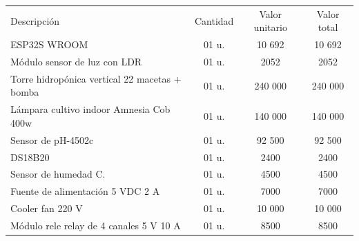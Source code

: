 \documentclass[
11pt, %
]{charter}
\begin{document}
\begin{table}[htpb]
\centering
\begin{tabularx}{\linewidth}{@{}|X|c|r|r|@{}}
\hline
\rowcolor[HTML]{C0C0C0} 
\multicolumn{4}{|c|}{\cellcolor[HTML]{C0C0C0}COSTOS DIRECTOS} \\ \hline
\rowcolor[HTML]{C0C0C0} 
Descripción &
  \multicolumn{1}{c|}{\cellcolor[HTML]{C0C0C0}Cantidad} &
  \multicolumn{1}{c|}{\cellcolor[HTML]{C0C0C0}Valor unitario} &
  \multicolumn{1}{c|}{\cellcolor[HTML]{C0C0C0}Valor total} \\ \hline
ESP32S WROOM &
  \multicolumn{1}{c|}{01 u.} & 
  \multicolumn{1}{c|}{10 692} &
  \multicolumn{1}{c|}{10 692} \\ \hline
  
  Módulo sensor de luz con LDR &
  \multicolumn{1}{c|}{01 u.} & 
  \multicolumn{1}{c|}{2052} &
  \multicolumn{1}{c|}{2052} \\ \hline 
  
   Torre hidropónica vertical 22 macetas + bomba&
  \multicolumn{1}{c|}{01 u.} & 
  \multicolumn{1}{c|}{240 000} &
  \multicolumn{1}{c|}{240 000} \\ \hline
  
     Lámpara cultivo indoor Amnesia Cob 400w &
  \multicolumn{1}{c|}{01 u.} & 
  \multicolumn{1}{c|}{140 000} &
  \multicolumn{1}{c|}{140 000} \\ \hline
  
    Sensor de pH-4502c &
  \multicolumn{1}{c|}{01 u.} & 
  \multicolumn{1}{c|}{92 500} &
  \multicolumn{1}{c|}{92 500} \\ \hline

  DS18B20 &
  \multicolumn{1}{c|}{01 u.} & 
  \multicolumn{1}{c|}{2400} &
  \multicolumn{1}{c|}{2400} \\ \hline  
  
 Sensor de humedad C.&
  \multicolumn{1}{c|}{01 u.} &
  \multicolumn{1}{c|}{4500} &
  \multicolumn{1}{c|}{4500} \\ \hline
  
   Fuente de alimentación 5 VDC 2 A&
  \multicolumn{1}{c|}{01 u.} &
  \multicolumn{1}{c|}{7000} &
  \multicolumn{1}{c|}{7000} \\ \hline
  
     Cooler fan 220 V&
  \multicolumn{1}{c|}{01 u.} &
  \multicolumn{1}{c|}{10 000} &
  \multicolumn{1}{c|}{10 000} \\ \hline 
  
Módulo rele relay de 4 canales 5 V 10 A&
  \multicolumn{1}{c|}{01 u.} &
  \multicolumn{1}{c|}{8500} &
  \multicolumn{1}{c|}{8500} \\ \hline
  

\end{tabularx}
\end{table}
\end{document}
